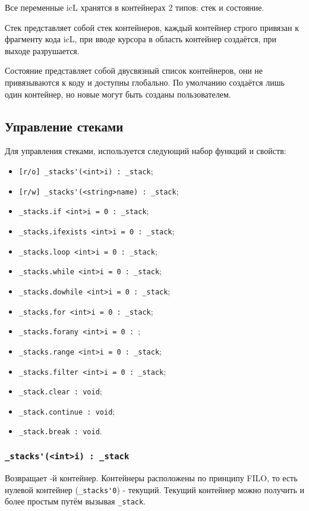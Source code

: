 \documentclass[a4paper, 14pt]{extarticle}
\newenvironment{icItems}
	{ \begin{itemize} [noitemsep,nolistsep] }
	{ \end{itemize} }
\begin{document}
Все переменные icL хранятся в контейнерах 2 типов: стек и состояние.

Стек представляет собой стек контейнеров, каждый контейнер строго привязан к фрагменту кода icL, при вводе курсора в область контейнер создаётся, при выходе разрушается.

Состояние представляет собой двусвязный список контейнеров, они не привязываются к коду и доступны глобально. По умолчанию создаётся лишь один контейнер, но новые могут быть созданы пользователем.

\subsection{Управление стеками}

Для управления стеками, используется следующий набор функций и свойств:
\begin{icItems}
	\item \lstinline|[r/o] _stacks'(<int>i) : _stack|;
	\item \lstinline|[r/w] _stacks'(<string>name) : _stack|;
	\item \lstinline|_stacks.if <int>i = 0 : _stack|;
	\item \lstinline|_stacks.ifexists <int>i = 0 : _stack|;
	\item \lstinline|_stacks.loop <int>i = 0 : _stack|;
	\item \lstinline|_stacks.while <int>i = 0 : _stack|;
	\item \lstinline|_stacks.dowhile <int>i = 0 : _stack|;
	\item \lstinline|_stacks.for <int>i = 0 : _stack|;
	\item \lstinline|_stacks.forany <int>i = 0 : |;
	\item \lstinline|_stacks.range <int>i = 0 : _stack|;
	\item \lstinline|_stacks.filter <int>i = 0 : _stack|;
	\item \lstinline|_stack.clear : void|;
	\item \lstinline|_stack.continue : void|;
	\item \lstinline|_stack.break : void|.
\end{icItems}

\subsubsection{\lstinline|_stacks'(<int>i) : _stack|}

Возвращает -й контейнер. Контейнеры расположены по принципу FILO, то есть нулевой контейнер (\lstinline|_stacks'0|) - текущий. Текущий контейнер можно получить и более простым путём вызывая \lstinline|_stack|.
\end{document}
